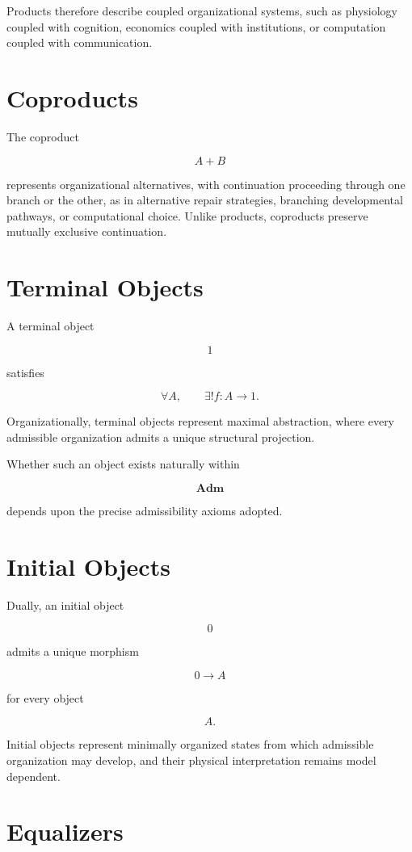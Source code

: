 \documentclass[11pt,oneside]{book}
\numberwithin{equation}{chapter}
\theoremstyle{definition}
\theoremstyle{plain}
\begin{document}
Products therefore describe coupled organizational systems, such as physiology coupled with cognition, economics coupled with institutions, or computation coupled with communication.

\section{Coproducts}

The coproduct

\[
A
+
B
\]

represents organizational alternatives, with continuation proceeding through one branch or the other, as in alternative repair strategies, branching developmental pathways, or computational choice. Unlike products, coproducts preserve mutually exclusive continuation.

\section{Terminal Objects}

A terminal object

\[
1
\]

satisfies

\[
\forall A,
\qquad
\exists !
f
:
A
\rightarrow
1.
\]

Organizationally, terminal objects represent maximal abstraction, where
every admissible organization admits a unique structural projection.

Whether such an object exists naturally within

\[
\mathbf{Adm}
\]

depends upon the precise admissibility axioms adopted.

\section{Initial Objects}

Dually, an initial object

\[
0
\]

admits a unique morphism

\[
0
\rightarrow
A
\]

for every object

\[
A.
\]

Initial objects represent minimally organized states from which admissible organization may develop, and their physical interpretation remains model dependent.

\section{Equalizers}
\end{document}
